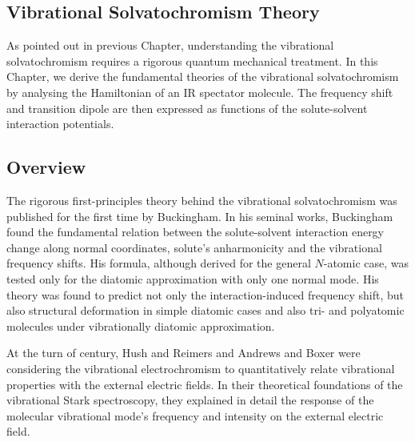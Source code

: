 \documentclass[a4paper,titlepage,twoside,fleqn,12pt]{book}
\begin{document}
\begin{refsection}
\chapter{Vibrational Solvatochromism Theory\label{c:background}}

As pointed out in previous Chapter, understanding the vibrational
solvatochromism requires a rigorous quantum mechanical treatment.
In this Chapter, we derive the fundamental theories of the vibrational
solvatochromism by analysing the Hamiltonian of an IR spectator molecule.
The frequency shift and transition dipole are then expressed as functions
of the solute\hyp{}solvent interaction potentials.

\section{Overview\label{s:theory}}

The rigorous first\hyp{}principles theory behind the vibrational solvatochromism was published
for the first time by Buckingham. \citep{Buckingham.ProcRSocLondonA.1958,
Buckingham.TransFaradaySoc.1960,Buckingham.ProcRSocLondonA.1960} 
In his seminal works, Buckingham found the fundamental 
relation between the solute\hyp{}solvent interaction energy change along normal 
coordinates, solute's anharmonicity and the vibrational frequency shifts.
His formula, although derived for the general $N$-atomic case, was tested
only for the diatomic approximation with only one normal mode. 
His theory was found to predict not only
the interaction\hyp{}induced frequency shift, but also structural deformation in simple
diatomic cases \citep{McDowell.Buckingham.MolPhys.2005,McDowell.Buckingham.JACS.2005,
McDowell.Buckingham.SpectrChimActaA.2005,Buckingham.CPL.2008} 
and also tri- and polyatomic molecules under 
vibrationally diatomic approximation. \citep{McDowell.Buckingham.SpectrChimActaA.2005,
Buckingham.CPL.2008,Herrebout.Delanoye.vanderVeken.JPCA.2004}

At the turn of  century, Hush and Reimers \citep{Hush.Reimers.JPC.1995,Reimers.Zeng.Hush.JPC.1996} 
and Andrews and Boxer \citep{Andrews.Boxer.JPCA.2002,Andrews.Boxer.JPCA.2000} 
were considering the vibrational electrochromism
to quantitatively relate vibrational properties with the external electric fields.
In their theoretical foundations of the vibrational Stark spectroscopy,
they explained in detail the response of the molecular vibrational mode's frequency
and intensity
on the external electric field. 


\end{refsection}
\end{document}
